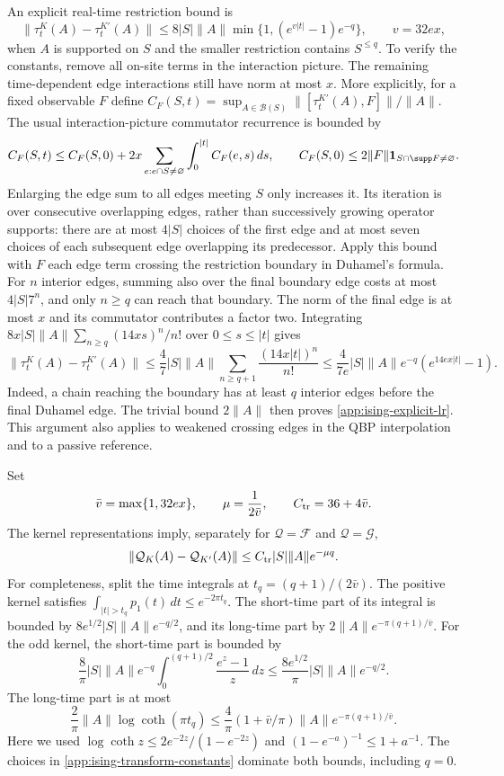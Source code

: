 An explicit real-time restriction bound is
\begin{equation}
 \|\tau_t^K(A)-\tau_t^{K'}(A)\|
 \le8|S|\|A\|\min\{1,(e^{v|t|}-1)e^{-q}\},
 \qquad v=32e x,
 \label{app:ising-explicit-lr}
\end{equation}
when $A$ is supported on $S$ and the smaller restriction contains
$S^{\le q}$. To verify the constants, remove all on-site terms in the
interaction picture. The remaining time-dependent edge interactions
still have norm at most $x$. More explicitly, for a fixed observable
$F$ define $C_F(S,t)=\sup_{A\in\mathcal B(S)}
\|[\tau_t^{K'}(A),F]\|/\|A\|$. The usual interaction-picture
commutator recurrence is bounded by
\[
 C_F(S,t)\le C_F(S,0)
       +2x\sum_{e:e\cap S\ne\varnothing}
              \int_0^{|t|}C_F(e,s)\,ds,
 \qquad
 C_F(S,0)\le2\|F\|\mathbf1_{S\cap\supp F\ne\varnothing}.
\]
Enlarging the edge sum to all edges meeting $S$ only increases it.
Its iteration is over consecutive overlapping edges, rather than
successively growing operator supports: there are at most $4|S|$
choices of the first edge and at most seven choices of each subsequent
edge overlapping its predecessor. Apply this bound with $F$ each
edge term crossing the restriction boundary in Duhamel's formula.
For $n$ interior edges, summing also over the final boundary edge
costs at most $4|S|7^n$, and only $n\ge q$ can reach that boundary.
The norm of the final edge is at most $x$ and its commutator contributes
a factor two. Integrating
$8x|S|\|A\|\sum_{n\ge q}(14xs)^n/n!$ over $0\le s\le|t|$ gives
\[
 \|\tau_t^K(A)-\tau_t^{K'}(A)\|
 \le\frac47 |S|\|A\|
       \sum_{n\ge q+1}\frac{(14x|t|)^n}{n!}
 \le\frac4{7e}|S|\|A\|e^{-q}(e^{14e x|t|}-1).
\]
Indeed, a chain reaching the boundary has at least $q$ interior edges
before the final Duhamel edge. The trivial bound $2\|A\|$ then proves
\eqref{app:ising-explicit-lr}. This argument also applies to weakened
crossing edges in the QBP interpolation and to a passive reference.

Set
\begin{equation}
 \bar v=\max\{1,32ex\},\qquad
 \mu=\frac1{2\bar v},\qquad C_{\rm tr}=36+4\bar v.
 \label{app:ising-transform-constants}
\end{equation}
The kernel representations imply, separately for
$\mathcal Q=\mathcal F$ and $\mathcal Q=\mathcal G$,
\begin{equation}
 \|\mathcal Q_K(A)-\mathcal Q_{K'}(A)\|
 \le C_{\rm tr}|S|\|A\|e^{-\mu q}.
 \label{app:ising-transform-bound}
\end{equation}
For completeness, split the time integrals at
$t_q=(q+1)/(2\bar v)$. The positive kernel satisfies
$\int_{|t|>t_q}p_1(t)\,dt\le e^{-2\pi t_q}$.
The short-time part of its integral is bounded by
$8e^{1/2}|S|\|A\|e^{-q/2}$, and its long-time part by
$2\|A\|e^{-\pi(q+1)/\bar v}$.
For the odd kernel, the short-time part is bounded by
\[
 \frac8\pi|S|\|A\|e^{-q}
 \int_0^{(q+1)/2}\frac{e^z-1}{z}\,dz
 \le\frac{8e^{1/2}}\pi|S|\|A\|e^{-q/2}.
\]
The long-time part is at most
\[
 \frac2\pi\|A\|\log\coth(\pi t_q)
 \le\frac4\pi(1+\bar v/\pi)\|A\|
          e^{-\pi(q+1)/\bar v}.
\]
Here we used $\log\coth z\le2e^{-2z}/(1-e^{-2z})$ and
$(1-e^{-a})^{-1}\le1+a^{-1}$. The choices in
\eqref{app:ising-transform-constants} dominate both bounds, including
$q=0$.

